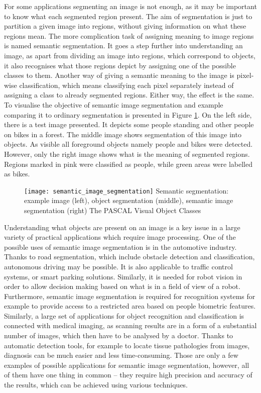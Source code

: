 For some applications segmenting an image is not enough, as it may be important to know what each segmented region present. The aim of segmentation is just to partition a given image into regions, without giving information on what these regions mean. The more complication task of assigning meaning to image regions is named semantic segmentation. It goes a step further into understanding an image, as apart from dividing an image into regions, which correspond to objects, it also recognises what those regions depict by assigning one of the possible classes to them. Another way of giving a semantic meaning to the image is pixel-wise classification, which means classifying each pixel separately instead of assigning a class to already segmented regions.  Either way, the effect is the same. To visualise the objective of semantic image segmentation and example comparing it to ordinary segmentation is presented in Figure  \ref{fig:semantic_image_segmentation}. 
On the left side, there is a test image presented. It depicts some people standing and other people on bikes in a forest. The middle image shows segmentation of this image into objects. As visible all foreground objects namely people and bikes were detected. However, only the right image shows what is the meaning of segmented regions. Regions marked in pink were classified as people, while green areas were labelled as bikes. 
\begin{figure}[h]
    \texttt{[image: semantic\_image\_segmentation]}
    \captionsource
    {Semantic segmentation: example image (left), object segmentation (middle), semantic image segmentation (right)}
    {The PASCAL Visual Object Classes \cite{voc}}
     \label{fig:semantic_image_segmentation}
\end{figure}

Understanding what objects are present on an image is a key issue in a large variety of practical applications which require image processing. One of the possible uses of semantic image segmentation is in the automotive industry. Thanks to road segmentation, which include obstacle detection and classification, autonomous driving may be possible. It is also applicable to traffic control systems, or smart parking solutions. Similarly, it is needed for robot vision in order to allow decision making based on what is in a field of view of a robot.  Furthermore, semantic image segmentation is required for recognition systems for example to provide access to a restricted area based on people biometric features. Similarly, a large set of applications for object recognition and classification is connected with medical imaging, as scanning results are in a form of a substantial number of images, which then have to be analysed by a doctor. Thanks to automatic detection tools, for example to locate tissue pathologies from images, diagnosis can be much easier and less time-consuming.  Those are only a few examples of possible applications for semantic image segmentation, however, all of them have one thing in common – they require high precision and accuracy of the results, which can be achieved using various techniques. 
 
